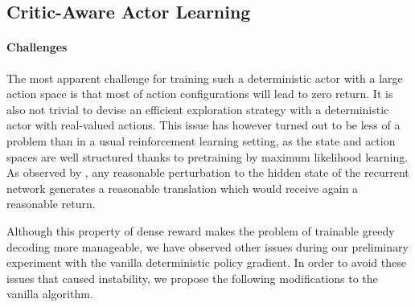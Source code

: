 \begin{figure}[t]
\begin{minipage}{\textwidth}
\end{minipage}
\end{figure}


\subsection{Critic-Aware Actor Learning}

\paragraph{Challenges}

The most apparent challenge for training such a deterministic actor with a large action space is that most of action configurations will lead to zero return. It is also not trivial to devise an efficient exploration strategy with a deterministic actor with real-valued actions. This issue has however turned out to be less of a problem than in a usual reinforcement learning setting, as the state and action spaces are well structured thanks to pretraining by maximum likelihood learning. As observed by \citet{cho2016noisy}, any reasonable perturbation to the hidden state of the recurrent network generates a reasonable translation which would receive again a reasonable return. 

Although this property of dense reward makes the problem of trainable greedy decoding more manageable, we have observed other issues during our preliminary experiment with the vanilla deterministic policy gradient. In order to avoid these issues that caused instability, we propose the following modifications to the vanilla algorithm.

